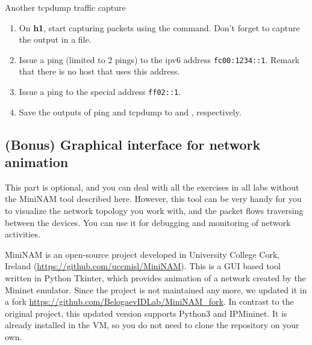 \begin{exercise}{Another tcpdump traffic capture}
\begin{enumerate}
	\item On \textbf{h1}, start capturing packets using the  command. Don't forget to capture the output in a file.
	\item Issue a ping (limited to 2 pings) to the \ac{ipv6} address \texttt{fc00:1234::1}. Remark that there is no host that uses this address.
	\item Issue a ping to the special address \texttt{ff02::1}.
	\item Save the outputs of ping and tcpdump to  and , respectively.
\end{enumerate}
\end{exercise}


\subsection{(Bonus) Graphical interface for network animation}

This part is optional, and you can deal with all the exercises in all labs without the MiniNAM tool described here. However, this tool can be very handy for you to visualize the network topology you work with, and the packet flows traversing between the devices. You can use it for debugging and monitoring of network activities.

MiniNAM is an open-source project developed in University College Cork, Ireland (\url{https://github.com/uccmisl/MiniNAM}). This is a GUI based tool written
in Python Tkinter, which provides animation of a network created by the Mininet emulator. Since the project is not maintained any more, we updated it in a 
fork \url{https://github.com/BelogaevIDLab/MiniNAM\_fork}. In contrast to the original project, this updated version supports Python3 and IPMininet. It is 
already installed in the VM, so you do not need to clone the repository on your own.

